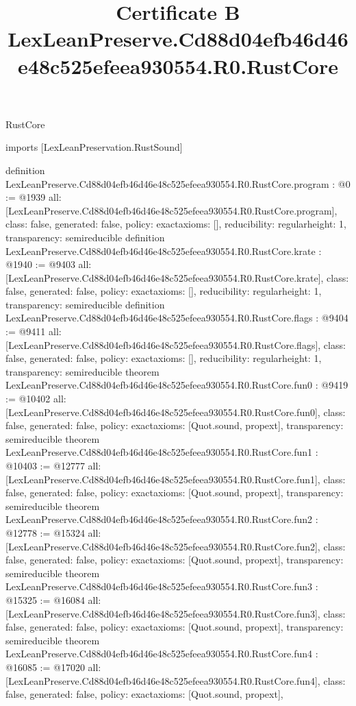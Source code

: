 \begin{lexlean}{RustCore}
\title{Certificate B LexLeanPreserve.Cd88d04efb46d46e48c525efeea930554.R0.RustCore}
\begin{coremodule}
imports [LexLeanPreservation.RustSound]

definition LexLeanPreserve.Cd88d04efb46d46e48c525efeea930554.R0.RustCore.program : @0 := @1939 {
  all: [LexLeanPreserve.Cd88d04efb46d46e48c525efeea930554.R0.RustCore.program],
  class: false,
  generated: false,
  policy: exact{axioms: []},
  reducibility: regular{height: 1},
  transparency: semireducible
}
definition LexLeanPreserve.Cd88d04efb46d46e48c525efeea930554.R0.RustCore.krate : @1940 := @9403 {
  all: [LexLeanPreserve.Cd88d04efb46d46e48c525efeea930554.R0.RustCore.krate],
  class: false,
  generated: false,
  policy: exact{axioms: []},
  reducibility: regular{height: 1},
  transparency: semireducible
}
definition LexLeanPreserve.Cd88d04efb46d46e48c525efeea930554.R0.RustCore.flags : @9404 := @9411 {
  all: [LexLeanPreserve.Cd88d04efb46d46e48c525efeea930554.R0.RustCore.flags],
  class: false,
  generated: false,
  policy: exact{axioms: []},
  reducibility: regular{height: 1},
  transparency: semireducible
}
theorem LexLeanPreserve.Cd88d04efb46d46e48c525efeea930554.R0.RustCore.fun0 : @9419 := @10402 {
  all: [LexLeanPreserve.Cd88d04efb46d46e48c525efeea930554.R0.RustCore.fun0],
  class: false,
  generated: false,
  policy: exact{axioms: [Quot.sound, propext]},
  transparency: semireducible
}
theorem LexLeanPreserve.Cd88d04efb46d46e48c525efeea930554.R0.RustCore.fun1 : @10403 := @12777 {
  all: [LexLeanPreserve.Cd88d04efb46d46e48c525efeea930554.R0.RustCore.fun1],
  class: false,
  generated: false,
  policy: exact{axioms: [Quot.sound, propext]},
  transparency: semireducible
}
theorem LexLeanPreserve.Cd88d04efb46d46e48c525efeea930554.R0.RustCore.fun2 : @12778 := @15324 {
  all: [LexLeanPreserve.Cd88d04efb46d46e48c525efeea930554.R0.RustCore.fun2],
  class: false,
  generated: false,
  policy: exact{axioms: [Quot.sound, propext]},
  transparency: semireducible
}
theorem LexLeanPreserve.Cd88d04efb46d46e48c525efeea930554.R0.RustCore.fun3 : @15325 := @16084 {
  all: [LexLeanPreserve.Cd88d04efb46d46e48c525efeea930554.R0.RustCore.fun3],
  class: false,
  generated: false,
  policy: exact{axioms: [Quot.sound, propext]},
  transparency: semireducible
}
theorem LexLeanPreserve.Cd88d04efb46d46e48c525efeea930554.R0.RustCore.fun4 : @16085 := @17020 {
  all: [LexLeanPreserve.Cd88d04efb46d46e48c525efeea930554.R0.RustCore.fun4],
  class: false,
  generated: false,
  policy: exact{axioms: [Quot.sound, propext]},
}
\end{coremodule}
\end{lexlean}
